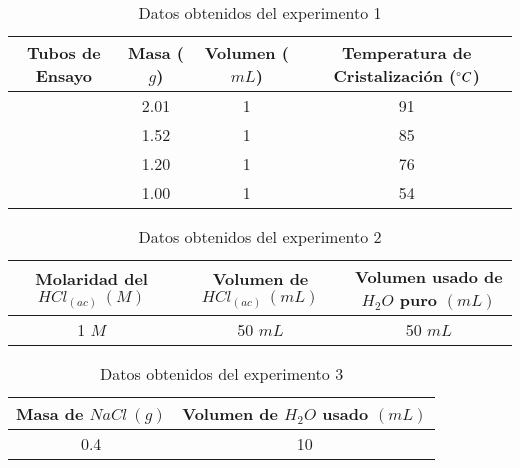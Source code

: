 \documentclass[../main.tex]{subfiles}
\begin{document}
\begin{table}[H]
    \centering
    \begin{tabular}{c|c|c|c}
        \hline
        Tubos de Ensayo & Masa ($g$) & Volumen ($mL$) & Temperatura de Cristalización ($\degree C$) \\
        \hline
        #1    &  2.01      &   1    &  91  \\
        #2    &  1.52      &   1    &  85  \\
        #3    &  1.20      &   1    &  76  \\
        #4    &  1.00      &   1    &  54  \\
        \hline
    \end{tabular}
    \label{tab:exp1}
    \caption{Datos obtenidos del experimento 1}
\end{table}

\begin{table}[H]
    \centering
    \begin{tabular}{c|c|c}
        \hline
        Molaridad del $HCl_{(ac)}\:(M)$ & Volumen de $HCl_{(ac)}\:(mL)$ & Volumen usado de $H_2O$ puro $(mL)$\\
        \hline
        1 $M$ & 50 $mL$ & 50 $mL$ \\ 
        \hline
    \end{tabular}
    \label{tab:exp2}
    \caption{Datos obtenidos del experimento 2}
\end{table}

\begin{table}[H]
    \centering
    \begin{tabular}{c|c}
        \hline
        Masa de $NaCl \:(g)$ & Volumen de $H_2O$ usado $(mL)$\\
        \hline
        0.4     &   10 \\
        \hline
    \end{tabular}
    \label{tab:exp3}
    \caption{Datos obtenidos del experimento 3}
\end{table}
\end{document}
